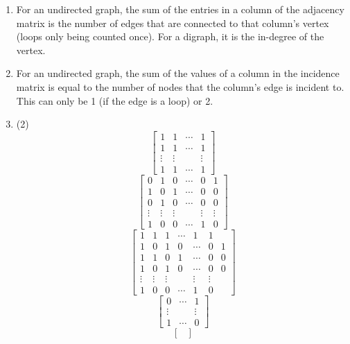 \documentclass[12pt, A4]{article}
\newcommand{\enumset}[1]{\setcounter{enumi}{#1}}
\begin{document}
\begin{enumerate}
\[{								a & 1 & 1  & 1 & 1 & 0 & 0 & 0 & 0 & 0 & 0 \\
								b & 0 & 0 & 0 & 0 & 1 & 1 & 1 & 1 & 0 & 0 \\
								c & 0 & 1 & 1 & 0 & 0 & 1 & 0 & 0 & 1 & 0 \\
								d & 0 & 0 & 0 & 1 & 0 & 0 & 1 & 1 & 0 & 1
							}
					\] 
				\enumset{32}
				\item
					For an undirected graph, the sum of the entries in a column of the adjacency matrix is the number of edges that are connected to that column's vertex (loops only being counted once). For a digraph, it is the in-degree of the vertex.
				\enumset{34}
				\item
					For an undirected graph, the sum of the values of a column in the incidence matrix is equal to the number of nodes that the column's edge is incident to. This can only be 1 (if the edge is a loop) or 2.
				\item
					\begin{tasks}(2)
						\task
							\[\begin{bmatrix}
								1 & 1 & \cdots & 1 \\
								1 & 1 & \cdots & 1 \\
								\vdots & \vdots & & \vdots \\
								1 & 1 & \cdots & 1
							\end{bmatrix}\]
						\task
							\[\begin{bmatrix}
								0 & 1 & 0 & \cdots & 0 & 1 \\
								1 & 0 & 1 & \cdots & 0 & 0 \\
								0 & 1 & 0 & \cdots & 0 & 0 \\
								\vdots & \vdots & \vdots & & \vdots & \vdots \\
								1 & 0 & 0 & \cdots & 1 & 0
							\end{bmatrix}\]
						\task
							\[\begin{bmatrix}
								1 & 1 & 1 & \cdots & 1 & 1 \\
								1 & 0 & 1 & 0 & \cdots & 0 & 1 \\
								1 & 1 & 0 & 1 & \cdots & 0 & 0 \\
								1 & 0 & 1 & 0 & \cdots & 0 & 0 \\
								\vdots & \vdots & \vdots & & \vdots & \vdots \\
								1 & 0 & 0 & \cdots & 1 & 0
							\end{bmatrix}\]
						\task
							\[\begin{bmatrix}
								0 & \cdots & 1 \\
								\vdots & & \vdots \\
								1 & \cdots & 0	
							\end{bmatrix}\]
						\task
							\[\begin{bmatrix}
								

\end{bmatrix}\]
\end{tasks}
\end{enumerate}
\end{document}
